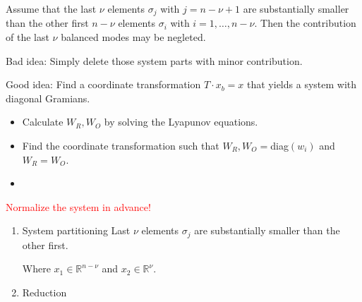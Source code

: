 \documentclass[10pt,a4paper]{scrartcl}
\begin{document}
\begin{multicols*}{3}
Assume that the last $\nu$ elements $\sigma_j$ with $j=n-\nu+1$ are substantially smaller than the other first $n-\nu$ elements $\sigma_i$ with $i=1,\ldots, n-\nu$. Then the contribution of the last $\nu$ balanced modes may be negleted.

\finn

Bad idea: Simply delete those system parts with minor contribution.

\finn

Good idea: Find a coordinate transformation $T\cdot x_b=x$ that yields a system with diagonal Gramians.

\begin{itemize}
\item Calculate $W_R,W_O$ by solving the Lyapunov equations.
\item Find the coordinate transformation such that $W_R,W_O=$diag$(w_i)$ and $W_R=W_O$.
\item {}
\end{itemize}

\textcolor{red}{Normalize the system in advance!}

\begin{enumerate}
\ncompaq
\item System partitioning
Last $\nu$ elements $\sigma_j$ are substantially smaller than the other first.

Where $x_1\in\mathbb{R}^{n-\nu}$ and $x_2\in\mathbb{R}^\nu$.
\item Reduction


\end{enumerate}
\end{multicols*}
\end{document}
